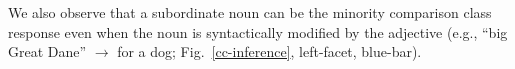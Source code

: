 \documentclass[a4paper,man,natbib]{apa6}
\newcommand{\mht}[1]{\textcolor{Blue}{[mht: #1]}}
\newcommand{\pt}[1]{\textcolor{Purple}{[pt: #1]}}
\newcommand{\datafoldername}{R_results_TeX}
\newcommand{\rlnum}[2]{\num[output-decimal-marker={.},
                             exponent-product = \cdot,
                             round-mode=places,
                             round-precision=#2,
                             group-digits=false]{#1}}
\newcommand{\rlgetnum}[5]{\csvreader[filter strcmp={\mykey}{#3},
             late after line = {{,}\ }, late after last line = {{}}]
            {\datafoldername/#1}{#2=\mykey,#4=\myvalue}{\rlnum{\myvalue}{#5}}}
\begin{document}
We also observe that a subordinate noun can be the minority comparison class response even when the noun is syntactically modified by the adjective (e.g., ``big Great Dane'' $\rightarrow$ for a dog; Fig.~\ref{cc-inference}, left-facet, blue-bar). %




\end{document}

